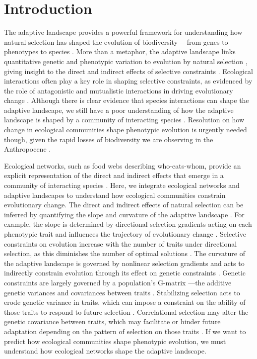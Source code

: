\documentclass[11pt,]{article}
\begin{document}
\newpage

\section{Introduction}\label{introduction}

The adaptive landscape provides a powerful framework for understanding
how natural selection has shaped the evolution of biodiversity ---from
genes to phenotypes to species
\citep{Wright1931, Simpson1944, Arnold2001}. More than a metaphor, the
adaptive landscape links quantitative genetic and phenotypic variation
to evolution by natural selection
\citep{Lande1979, Arnold1984applications, Arnold1984theory}, giving
insight to the direct and indirect effects of selective constraints
\citep{Arnold1992}. Ecological interactions often play a key role in
shaping selective constraints, as evidenced by the role of antagonistic
and mutualistic interactions in driving evolutionary change
\citep{Schluter2000, Abrams2000, Bronstein2006}. Although there is clear
evidence that species interactions can shape the adaptive landscape, we
still have a poor understanding of how the adaptive landscape is shaped
by a community of interacting species \citep{McPeek2017, terHorst2018}.
Resolution on how change in ecological communities shape phenotypic
evolution is urgently needed though, given the rapid losses of
biodiversity we are observing in the Anthropocene \citep{Scheffers2016}.

Ecological networks, such as food webs describing who-eats-whom, provide
an explicit representation of the direct and indirect effects that
emerge in a community of interacting species
\citep{Bascompte2014, McCann2012}. Here, we integrate ecological
networks and adaptive landscapes to understand how ecological
communities constrain evolutionary change. The direct and indirect
effects of natural selection can be inferred by quantifying the slope
and curvature of the adaptive landscape \citep{Arnold1992}. For example,
the slope is determined by directional selection gradients acting on
each phenotypic trait and influences the trajectory of evolutionary
change \citep{Lande1979, Arnold1992}. Selective constraints on evolution
increase with the number of traits under directional selection, as this
diminishes the number of optimal solutions \citep{Arnold2003}. The
curvature of the adaptive landscape is governed by nonlinear selection
gradients and acts to indirectly constrain evolution through its effect
on genetic constraints \citep{Arnold1992, Hansen2008}. Genetic
constraints are largely governed by a population's G-matrix ---the
additive genetic variances and covariances between traits
\citep{Hansen2008}. Stabilizing selection acts to erode genetic variance
in traits, which can impose a constraint on the ability of those traits
to respond to future selection \citep{Hansen2008}. Correlational
selection may alter the genetic covariance between traits, which may
facilitate or hinder future adaptation depending on the pattern of
selection on those traits \citep{Hansen2008}. If we want to predict how
ecological communities shape phenotypic evolution, we must understand
how ecological networks shape the adaptive landscape.
\end{document}
